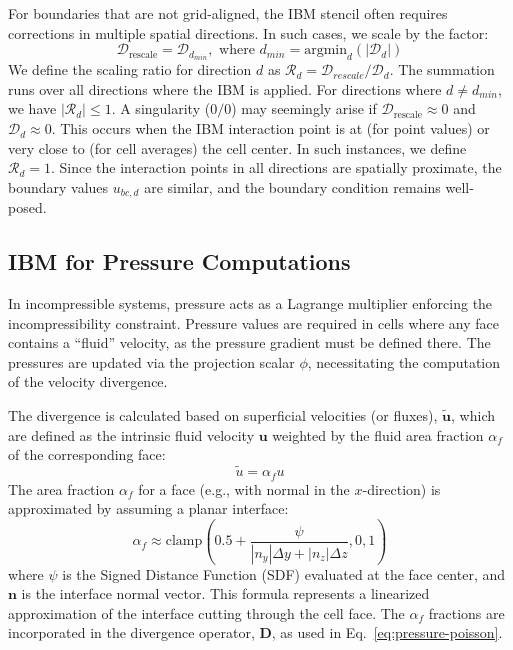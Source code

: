 \documentclass[preprint,12pt]{elsarticle}
\begin{document}
For boundaries that are not grid-aligned, the IBM stencil often requires corrections in multiple spatial directions. In such cases, we scale by the factor:
\begin{equation}
  \mathcal{D}_\mathrm{rescale} = \mathcal{D}_{d_{min}}, \text{ where } d_{min} = \mathrm{argmin}_{d} (|\mathcal{D}_d|) \label{eq:D_rescale}
\end{equation}
We define the scaling ratio for direction $d$ as $\mathcal{R}_d = \mathcal{D}_{rescale}/\mathcal{D}_d$.
The summation runs over all directions where the IBM is applied. For directions where $d \neq d_{min}$, we have $|\mathcal{R}_d| \le 1$. A singularity ($0/0$) may seemingly arise if $\mathcal{D}_\mathrm{rescale} \approx 0$ and $\mathcal{D}_{d} \approx 0$. This occurs when the IBM interaction point is at (for point values) or very close to (for cell averages) the cell center. In such instances, we define $\mathcal{R}_d = 1$. Since the interaction points in all directions are spatially proximate, the boundary values $u_{bc,d}$ are similar, and the boundary condition remains well-posed.

\subsection{IBM for Pressure Computations}

In incompressible systems, pressure acts as a Lagrange multiplier enforcing the incompressibility constraint. Pressure values are required in cells where any face contains a ``fluid'' velocity, as the pressure gradient must be defined there. The pressures are updated via the projection scalar $\phi$, necessitating the computation of the velocity divergence.

The divergence is calculated based on superficial velocities (or fluxes), $\tilde{\mathbf{u}}$, which are defined as the intrinsic fluid velocity $\mathbf{u}$ weighted by the fluid area fraction $\alpha_f$ of the corresponding face:
\begin{equation}
    \tilde{u} = \alpha_f u
\end{equation}
The area fraction $\alpha_f$ for a face (e.g., with normal in the $x$-direction) is approximated by assuming a planar interface:
\begin{equation}
    \alpha_f \approx \text{clamp}\left( 0.5 + \frac{\psi}{ |n_y|\Delta y + |n_z|\Delta z } , 0, 1 \right)
\end{equation}
where $\psi$ is the Signed Distance Function (SDF) evaluated at the face center, and $\mathbf{n}$ is the interface normal vector. This formula represents a linearized approximation of the interface cutting through the cell face. The $\alpha_f$ fractions are incorporated in the divergence operator, $\mathbf{D}$, as used in Eq.~\eqref{eq:pressure-poisson}.
\end{document}

